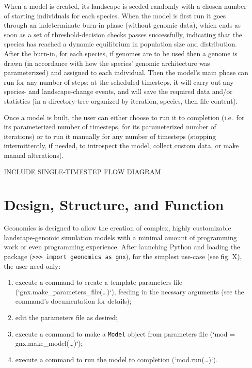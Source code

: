 ﻿\documentclass{article}
\begin{document}
When a model is created, its landscape is seeded randomly with a chosen number of
starting individuals for each species. When the model is first run it goes through an
indeterminate burn-in phase (without genomic data), which ends as soon as a set of
threshold-decision checks passes successfully, indicating that the species has
reached a dynamic equilibrium in population size and distribution.
After the burn-in, for each species, if genomes are to be used then a genome is drawn
(in accordance with how the species' genomic architecture was parameterized)
and assigned to each individual.
Then the model's main phase can run for any number of steps; at the scheduled
timesteps, it will carry out any species- and landscape-change events,
and will save the required data and/or statistics
(in a directory-tree organized by iteration, species, then file content).

Once a model is built, the user can either choose to run it to completion (i.e.\ for its
parameterized number of timesteps, for its parameterized number of iterations) or to
run it manually for any number of timesteps (stopping intermittently, if needed, to
introspect the model, collect custom data, or make manual alterations).

{\large INCLUDE SINGLE-TIMESTEP FLOW DIAGRAM}


\section{Design, Structure, and Function}
Geonomics is designed to allow the creation of complex, highly customizable
landscape-genomic simulation models with a minimal amount of programming work or even
programming experience.
After launching Python and loading the package (\texttt{>>> import geonomics as gnx}),
for the simplest use-case (see fig. X), the user need only:
\begin{enumerate}
        \item execute a command to create a template parameters file (`gnx.make\_parameters\_file(\ldots)`), feeding in the necssary arguments (see the command's documentation for details);
        \item edit the parameters file as desired;
        \item execute a command to make a \texttt{Model} object from parameters file (`mod = gnx.make\_model(\ldots)`);
        \item execute a command to run the model to completion (`mod.run(\ldots)`).
\end{enumerate}
\end{document}
